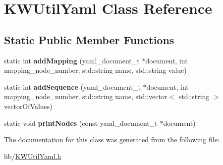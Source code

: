 \hypertarget{class_k_w_util_yaml}{\section{K\-W\-Util\-Yaml Class Reference}
\label{class_k_w_util_yaml}
}
\subsection*{Static Public Member Functions}
\begin{DoxyCompactItemize}
\item 
\hypertarget{class_k_w_util_yaml_ac0556f61a465b655c9ee84d7845f66a4}{static int {\bfseries add\-Mapping} (yaml\-\_\-document\-\_\-t $\ast$document, int mapping\-\_\-node\-\_\-number, std\-::string name, std\-::string value)}\label{class_k_w_util_yaml_ac0556f61a465b655c9ee84d7845f66a4}

\item 
\hypertarget{class_k_w_util_yaml_ac78930bb6e6f668536a84df67ccb5334}{static int {\bfseries add\-Sequence} (yaml\-\_\-document\-\_\-t $\ast$document, int mapping\-\_\-node\-\_\-number, std\-::string name, std\-::vector$<$ std\-::string $>$ vector\-Of\-Values)}\label{class_k_w_util_yaml_ac78930bb6e6f668536a84df67ccb5334}

\item 
\hypertarget{class_k_w_util_yaml_afc954ea9b4a762c109abbe23991cec65}{static void {\bfseries print\-Nodes} (const yaml\-\_\-document\-\_\-t $\ast$document)}\label{class_k_w_util_yaml_afc954ea9b4a762c109abbe23991cec65}

\end{DoxyCompactItemize}


The documentation for this class was generated from the following file\-:\begin{DoxyCompactItemize}
\item 
lib/\hyperlink{_k_w_util_yaml_8h}{K\-W\-Util\-Yaml.\-h}\end{DoxyCompactItemize}
